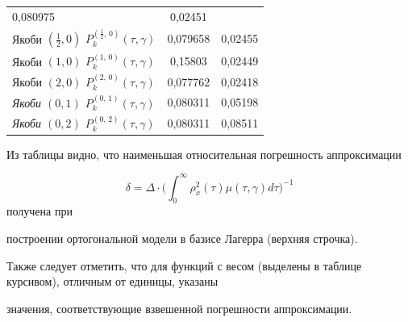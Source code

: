 \begin{table}[h!]
\begin{tabular}{l|c|c}
0,080975&

0,02451 \\


Якоби $(\frac12, 0)$ $P_k^{(\frac12,\, 0)} (\tau, \gamma)$&

0,079658&

0,02455 \\


Якоби $(1, 0)$ $P_k^{(1,\, 0)} (\tau, \gamma)$&

0,15803&

0,02449 \\


Якоби $(2, 0)$ $P_k^{(2,\, 0)} (\tau, \gamma)$&

0,077762&

0,02418 \\


\it Якоби $(0, 1)$ $P_k^{(0,\, 1)} (\tau, \gamma)$&

0,080311&

0,05198 \\


\it Якоби $(0, 2)$ $P_k^{(0,\, 2)} (\tau, \gamma)$&

0,080311&

0,08511 \\

\hline

\end{tabular}



\end{table}



Из таблицы видно, что наименьшая относительная погрешность аппроксимации

$$\delta  =\Delta\cdot  \biggl(\int_0^\infty \rho _x^2  ( \tau  )\mu  ( \tau , \gamma  )d\tau  \biggr)^{-1}

$$ получена при

построении ортогональной модели в базисе Лагерра (верхняя строчка).

Также следует отметить, что для функций с весом (выделены в таблице курсивом), отличным от единицы, указаны

значения, соответствующие взвешенной погрешности аппроксимации.







